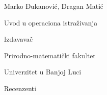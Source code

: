 \documentclass[b5paper, utf8, 11pt, colorlinks]{book}
\theoremstyle{definition}
\begin{document}

\thispagestyle{empty}

 Marko Đukanović, Dragan Matić
 
Uvod u operaciona istraživanja
 
 \vspace{1cm}
 
 Izdavavač
 
 Prirodno-matematički fakultet
 
 Univerzitet u Banjoj Luci
 
 \vspace{1cm}
 
 Recenzenti
 
\end{document}
